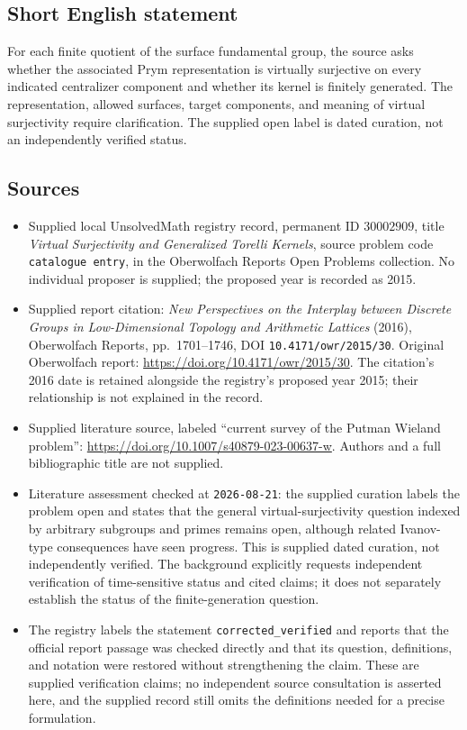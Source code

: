 \documentclass[11pt]{article}
\begin{document}
\subsection{Short English statement}
For each finite quotient of the surface fundamental group, the source asks whether the associated Prym representation is virtually surjective on every indicated centralizer component and whether its kernel is finitely generated. The representation, allowed surfaces, target components, and meaning of virtual surjectivity require clarification. The supplied open label is dated curation, not an independently verified status.
\subsection{Sources}
\begin{itemize}
\item Supplied local UnsolvedMath registry record, permanent ID \(30002909\), title \emph{Virtual Surjectivity and Generalized Torelli Kernels}, source problem code \texttt{catalogue entry}, in the Oberwolfach Reports Open Problems collection. No individual proposer is supplied; the proposed year is recorded as 2015.
\item Supplied report citation: \emph{New Perspectives on the Interplay between Discrete Groups in Low-Dimensional Topology and Arithmetic Lattices} (2016), Oberwolfach Reports, pp.\ 1701--1746, DOI \texttt{10.4171/owr/2015/30}. Original Oberwolfach report: \url{https://doi.org/10.4171/owr/2015/30}. The citation's 2016 date is retained alongside the registry's proposed year 2015; their relationship is not explained in the record.
\item Supplied literature source, labeled ``current survey of the Putman Wieland problem'': \url{https://doi.org/10.1007/s40879-023-00637-w}. Authors and a full bibliographic title are not supplied.
\item Literature assessment checked at \texttt{2026-08-21}: the supplied curation labels the problem open and states that the general virtual-surjectivity question indexed by arbitrary subgroups and primes remains open, although related Ivanov-type consequences have seen progress. This is supplied dated curation, not independently verified. The background explicitly requests independent verification of time-sensitive status and cited claims; it does not separately establish the status of the finite-generation question.
\item The registry labels the statement \texttt{corrected\_verified} and reports that the official report passage was checked directly and that its question, definitions, and notation were restored without strengthening the claim. These are supplied verification claims; no independent source consultation is asserted here, and the supplied record still omits the definitions needed for a precise formulation.
\end{itemize}
\end{document}
